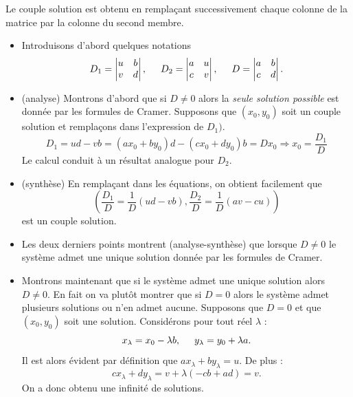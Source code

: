 \begin{rem}
 Le couple solution est obtenu en remplaçant successivement chaque colonne de la matrice par la colonne du second membre.
\end{rem}
\begin{demo}
 \begin{itemize}
  \item Introduisons d'abord quelques notations 
\[
 D_1 =\begin{vmatrix}
  u & b \\
  v & d
\end{vmatrix}
 , \hspace{0.5cm}
 D_2 =\begin{vmatrix}
  a & u \\
  c & v
\end{vmatrix}
 , \hspace{0.5cm}
 D =\begin{vmatrix}
  a & b \\
  c & d
\end{vmatrix}.
\]

\item (analyse) Montrons d'abord que si $D\neq 0$ alors la \emph{seule solution possible} est donnée par les formules de Cramer. Supposons que $(x_0,y_0)$ soit un couple solution et remplaçons dans l'expression de $D_1)$.
\begin{displaymath}
 D_1 = ud-vb = (ax_0 + by_0)d-(cx_0+dy_0)b = D x_0 \Rightarrow x_0 = \dfrac{D_1}{D}
\end{displaymath}
Le calcul conduit à un résultat analogue pour $D_2$.

\item (synthèse) En remplaçant dans les équations, on obtient facilement que
\begin{displaymath}
 (\dfrac{D_1}{D}=\dfrac{1}{D}(ud-vb), \dfrac{D_2}{D}=\dfrac{1}{D}(av-cu))
\end{displaymath}
 est un couple solution.

\item Les deux derniers points montrent (analyse-synthèse) que lorsque $D\neq0$ le système admet une unique solution donnée par les formules de Cramer.

\item Montrons maintenant que si le système admet une unique solution alors $D\neq 0$. En fait on va plutôt montrer que si $D=0$ alors le système admet plusieurs solutions ou n'en admet aucune.\newline
Supposons que $D=0$ et que $(x_0,y_0)$ soit une solution. Considérons pour tout réel $\lambda$ :
\[
 x_\lambda = x_0 -\lambda b, \hspace{0.5cm} y_\lambda = y_0 +\lambda a.
\]
Il est alors évident par définition que $ax_\lambda + by_\lambda =u$. De plus :
\begin{displaymath}
 cx_\lambda + dy_\lambda = v +\lambda(-cb+ad) = v.
\end{displaymath}
On a donc obtenu une infinité de solutions.
\end{itemize}
\end{demo}


